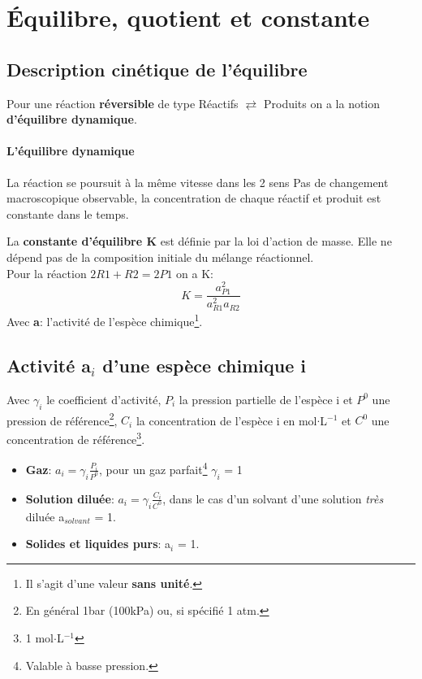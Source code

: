 \documentclass[10pt,a4paper]{book}
\begin{document}
\section{Équilibre, quotient et constante} %

\subsection{Description cinétique de l'équilibre}

Pour une réaction \textbf{réversible} de type Réactifs $\rightleftarrows$ Produits on a la notion \textbf{d'équilibre dynamique}.
\paragraph{L'équilibre dynamique} La réaction se poursuit à la même vitesse dans les 2 sens
Pas de changement macroscopique observable, la concentration de chaque réactif et produit est constante dans le temps. \par
La \textbf{constante d’équilibre K} est définie par la loi d’action de masse. Elle ne dépend pas de la composition initiale du mélange réactionnel. \\
Pour la réaction \(2R1 + R2 = 2P1\) on a K:
\[K = \frac{a_{P1}^2}{a_{R1}^2 a_{R2}}\]
Avec \textbf{a}: l'activité de l'espèce chimique\footnote{Il s'agit d'une valeur \textbf{sans unité}.}.

\subsection{Activité a$_i$ d'une espèce chimique i}

Avec \textbf{$\gamma_i$} le coefficient d'activité, $P_i$ la pression partielle de l'espèce i et $P^0$ une pression de référence\footnote{En général 1bar (100kPa) ou, si spécifié 1 atm.}, $C_i$ la concentration de l'espèce i en mol$\cdot$L$^{-1}$ et $C^0$ une concentration de référence\footnote{1 mol$\cdot$L$^{-1}$}.
\begin{itemize}
\item \textbf{Gaz}: \(a_i = \gamma_i\frac{P_i}{P^0}\), pour un gaz parfait\footnote{Valable à basse pression.} $\gamma_i$ = 1
\item \textbf{Solution diluée}: \(a_i = \gamma_i\frac{C_i}{C^0}\), dans le cas d'un solvant d'une solution \textit{très} diluée a$_{solvant}$ = 1.
\item \textbf{Solides et liquides purs}: a$_i$ = 1.
\end{itemize}
\end{document}
